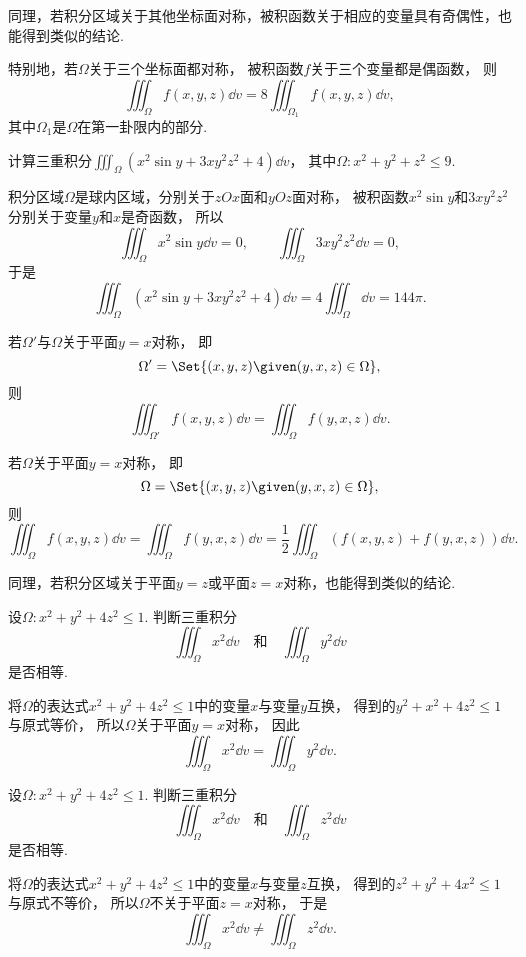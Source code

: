 同理，若积分区域关于其他坐标面对称，被积函数关于相应的变量具有奇偶性，也能得到类似的结论.

特别地，若\(\Omega\)关于三个坐标面都对称，
被积函数\(f\)关于三个变量都是偶函数，
则\[
	\iiint_\Omega f(x,y,z) \dd{v}
	= 8 \iiint_{\Omega_1} f(x,y,z) \dd{v},
\]
其中\(\Omega_1\)是\(\Omega\)在第一卦限内的部分.

\begin{example}
计算三重积分\(\iiint_\Omega (x^2 \sin y + 3xy^2z^2 + 4) \dd{v}\)，
其中\(\Omega: x^2+y^2+z^2\leq9\).
\begin{solution}
积分区域\(\Omega\)是球内区域，分别关于\(zOx\)面和\(yOz\)面对称，
被积函数\(x^2 \sin y\)和\(3xy^2z^2\)分别关于变量\(y\)和\(x\)是奇函数，
所以\[
	\iiint_\Omega x^2 \sin y \dd{v} = 0,
	\qquad
	\iiint_\Omega 3xy^2z^2 \dd{v} = 0,
\]
于是\[
	\iiint_\Omega (x^2 \sin y + 3xy^2z^2 + 4) \dd{v}
	= 4 \iiint_\Omega \dd{v}
	= 144 \pi.
\]
\end{solution}
\end{example}

若\(\Omega'\)与\(\Omega\)关于平面\(y=x\)对称，
即\[
	\Omega' = \Set{ (x,y,z) \given (y,x,z) \in \Omega },
\]
则\[
	\iiint_{\Omega'} f(x,y,z) \dd{v}
	= \iiint_\Omega f(y,x,z) \dd{v}.
\]

若\(\Omega\)关于平面\(y=x\)对称，
即\[
	\Omega = \Set{ (x,y,z) \given (y,x,z) \in \Omega },
\]
则\[
	\iiint_\Omega f(x,y,z) \dd{v}
	= \iiint_\Omega f(y,x,z) \dd{v}
	= \frac12 \iiint_\Omega (f(x,y,z) + f(y,x,z)) \dd{v}.
\]

同理，若积分区域关于平面\(y=z\)或平面\(z=x\)对称，也能得到类似的结论.

\begin{example}
设\(\Omega: x^2+y^2+4z^2\leq1\).
判断三重积分\[
	\iiint_\Omega x^2 \dd{v}
	\quad\text{和}\quad
	\iiint_\Omega y^2 \dd{v}
\]是否相等.
\begin{solution}
将\(\Omega\)的表达式\(x^2+y^2+4z^2\leq1\)中的变量\(x\)与变量\(y\)互换，
得到的\(y^2+x^2+4z^2\leq1\)与原式等价，
所以\(\Omega\)关于平面\(y=x\)对称，
因此\[
	\iiint_\Omega x^2 \dd{v}
	= \iiint_\Omega y^2 \dd{v}.
\]
\end{solution}
\end{example}

\begin{example}
设\(\Omega: x^2+y^2+4z^2\leq1\).
判断三重积分\[
	\iiint_\Omega x^2 \dd{v}
	\quad\text{和}\quad
	\iiint_\Omega z^2 \dd{v}
\]是否相等.
\begin{solution}
将\(\Omega\)的表达式\(x^2+y^2+4z^2\leq1\)中的变量\(x\)与变量\(z\)互换，
得到的\(z^2+y^2+4x^2\leq1\)与原式不等价，
所以\(\Omega\)不关于平面\(z=x\)对称，
于是\[
	\iiint_\Omega x^2 \dd{v}
	\neq \iiint_\Omega z^2 \dd{v}.
\]
\end{solution}
\end{example}

